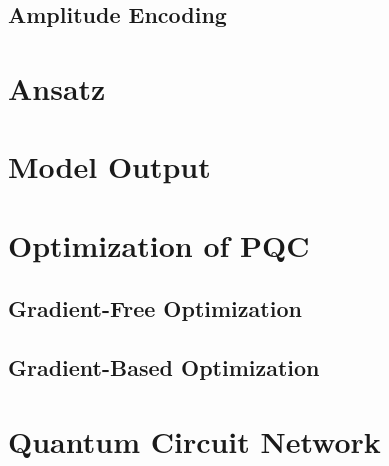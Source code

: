 \subsection{Amplitude Encoding}\label{sec:AmplitudeEncoding}


\section{Ansatz}\label{sec:Anzats}

\section{Model Output}\label{sec:ModelOutput}


\section{Optimization of PQC}\label{sec:OptPQC}


\subsection{Gradient-Free Optimization}\label{sec:Grad-FreeOpt}


\subsection{Gradient-Based Optimization}\label{sec:Grad-FreeOpt}


\section{Quantum Circuit Network}\label{sec:Quantum Kernel Network}


